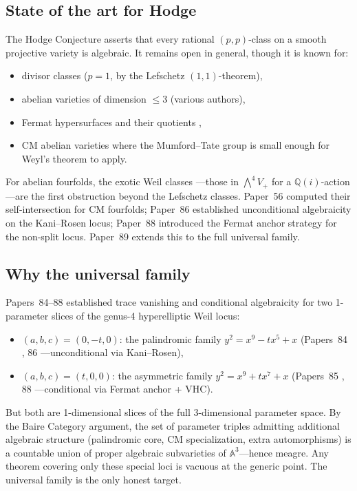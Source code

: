 \documentclass[11pt,a4paper]{article}
\theoremstyle{definition}
\theoremstyle{remark}
\newcommand{\QQ}{\mathbb{Q}}
\newcommand{\Aff}{\mathbb{A}}
\begin{document}
\subsection{State of the art for Hodge}

The Hodge Conjecture \cite{Hodge1950} asserts that every rational
$(p,p)$-class on a smooth projective variety is algebraic.
It remains open in general, though it is known for:
\begin{itemize}[nosep]
  \item divisor classes ($p = 1$, by the Lefschetz $(1,1)$-theorem),
  \item abelian varieties of dimension $\leq 3$ (various authors),
  \item Fermat hypersurfaces and their quotients \cite{Shioda1979, Shioda1982},
  \item CM abelian varieties where the Mumford--Tate group is small enough
        for Weyl's theorem to apply.
\end{itemize}
For abelian fourfolds, the exotic Weil classes \cite{Weil1977}---those in
$\bigwedge^4 V_+$ for a $\QQ(i)$-action---are the first obstruction
beyond the Lefschetz classes.
Paper~56 \cite{Lee2025P56} computed their self-intersection for CM fourfolds; Paper~86 \cite{Lee2025P86}
established unconditional algebraicity on the Kani--Rosen locus;
Paper~88 \cite{Lee2025P88} introduced the Fermat anchor strategy for the non-split locus.
Paper~89 extends this to the full universal family.

\subsection{Why the universal family}

Papers~84--88 established trace vanishing and conditional algebraicity for
two 1-parameter slices of the genus-4 hyperelliptic Weil locus:
\begin{itemize}[nosep]
  \item $(a,b,c) = (0,-t,0)$: the palindromic family $y^2 = x^9 - tx^5 + x$
        (Papers~84 \cite{Lee2025P84}, 86 \cite{Lee2025P86}---unconditional via Kani--Rosen),
  \item $(a,b,c) = (t,0,0)$: the asymmetric family $y^2 = x^9 + tx^7 + x$
        (Papers~85 \cite{Lee2025P85}, 88 \cite{Lee2025P88}---conditional via Fermat anchor + VHC).
\end{itemize}
But both are 1-dimensional slices of the full 3-dimensional parameter space.
By the Baire Category argument, the set of parameter triples admitting
additional algebraic structure (palindromic core, CM specialization, extra
automorphisms) is a countable union of proper algebraic subvarieties of
$\Aff^3$---hence meagre.
Any theorem covering only these special loci is vacuous at the generic point.
The universal family is the only honest target.
\end{document}
